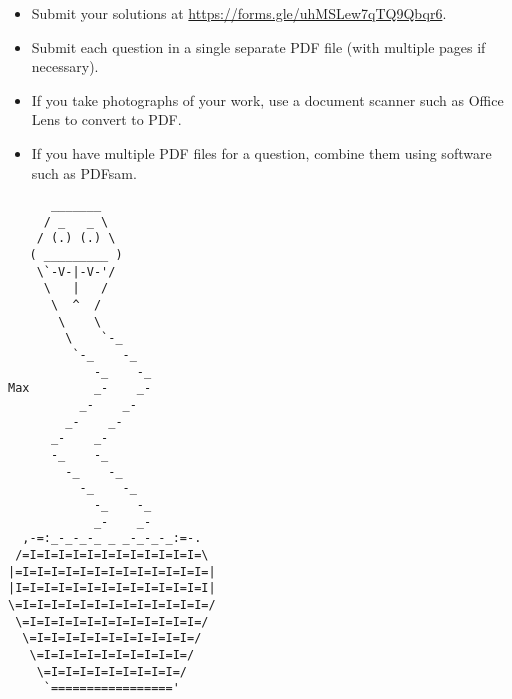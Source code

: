 \documentclass{article}
\begin{document}
\vfill
\vfill
\begin{itemize}
	\item Submit your solutions at \url{https://forms.gle/uhMSLew7qTQ9Qbqr6}.
	\item Submit each question in a single separate PDF file (with multiple pages if necessary).
	\item If you take photographs of your work, use a document scanner such as Office Lens to convert to PDF.
	\item If you have multiple PDF files for a question, combine them using software such as PDFsam.
\end{itemize}

\vfill
\centering
\scriptsize
\begin{BVerbatim}
      _______
     / _   _ \
    / (.) (.) \
   ( _________ )
    \`-V-|-V-'/
     \   |   /
      \  ^  /
       \    \
        \    `-_
         `-_    -_
            -_    -_
Max         _-    _-
          _-    _-
        _-    _-
      _-    _-
      -_    -_
        -_    -_
          -_    -_
            -_    -_
            _-    _-
  ,-=:_-_-_-_ _ _-_-_-_:=-.
 /=I=I=I=I=I=I=I=I=I=I=I=I=\
|=I=I=I=I=I=I=I=I=I=I=I=I=I=|
|I=I=I=I=I=I=I=I=I=I=I=I=I=I|
\=I=I=I=I=I=I=I=I=I=I=I=I=I=/
 \=I=I=I=I=I=I=I=I=I=I=I=I=/
  \=I=I=I=I=I=I=I=I=I=I=I=/
   \=I=I=I=I=I=I=I=I=I=I=/
    \=I=I=I=I=I=I=I=I=I=/
     `================='
\end{BVerbatim}
\end{document}

